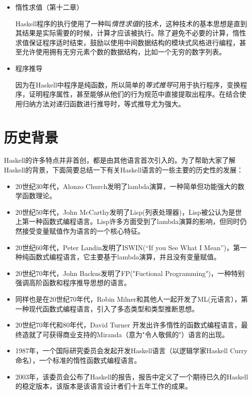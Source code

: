 \begin{itemize}
\item 惰性求值（第十二章）

Haskell程序的执行使用了一种叫\textit{惰性求值}的技术，这种技术的基本思想是直到其结果是实际需要的时候，计算才应该被执行。除了避免不必要的计算，惰性求值保证程序适时结束，鼓励以使用中间数据结构的模块式风格进行编程，甚至允许使用拥有无穷元素个数的数据结构，比如一个无穷的数字列表。

\item 程序推导

因为在Haskell中程序是纯函数，所以简单的\textit{等式推导}可用于执行程序，变换程序，证明程序属性，甚至能够从他们的行为规范中直接提取出程序。在结合使用归纳方法对递归函数进行推导时，等式推导尤为强大。
\end{itemize}

\section{历史背景}
Haskell的许多特点并非首创，都是由其他语言首次引入的。为了帮助大家了解Haskell的背景，下面简要总结一下有关Haskell语言的一些主要的历史性的发展： 

\begin{itemize}
\item 20世纪30年代，Alonzo Church发明了lambda演算，一种简单但功能强大的数学函数理论。
\item 20世纪50年代，John McCarthy发明了Lisp(列表处理器)，Lisp被公认为是世上第一种函数式编程语言。Lisp许多方面受到了lambda演算的影响，但同时仍然接受变量赋值作为语言的一个核心特征。
\item 20世纪60年代，Peter Landin发明了ISWIN(“If you See What I Mean”)，第一种纯函数式编程语言，它主要基于lambda演算，并且没有变量赋值。
\item 20世纪70年代，John Backus发明了FP("Fuctional
Programming")，一种特别强调高阶函数和程序推导思想的语言。
\item 同样也是在20世纪70年代，Robin Milner和其他人一起开发了ML(元语言），第一种现代函数式编程语言，引入了多态类型和类型推断思想。
\item 20世纪70年代和80年代，David Turner 开发出许多惰性的函数式编程语言，最终造就了可获得商业支持的Miranda（意为"令人敬佩的"）语言的出现。
\item 1987年，一个国际研究委员会发起开发Haskell语言（以逻辑学家Haskell Curry命名），一个标准的惰性函数式编程语言。
\item 2003年，该委员会公布了Haskell的报告，报告中定义了一个期待已久的Haskell的稳定版本，该版本是该语言设计者们十五年工作的成果。
\end{itemize}

